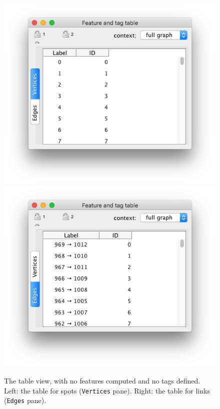 \begin{figure}
    \centering
    \null\hfill
    \includegraphics[height=0.23\textheight]{figures/Mastodon_TableView1.png}
    \hfill
    \includegraphics[height=0.23\textheight]{figures/Mastodon_TableView2.png}
    \hfill\null
    
    \caption{The table view, with no features computed and no tags defined. Left: the table for spots (\texttt{Vertices} pane). Right: the table for links (\texttt{Edges} pane).  }
    \label{fig:TableViewEmpty}
\end{figure}

